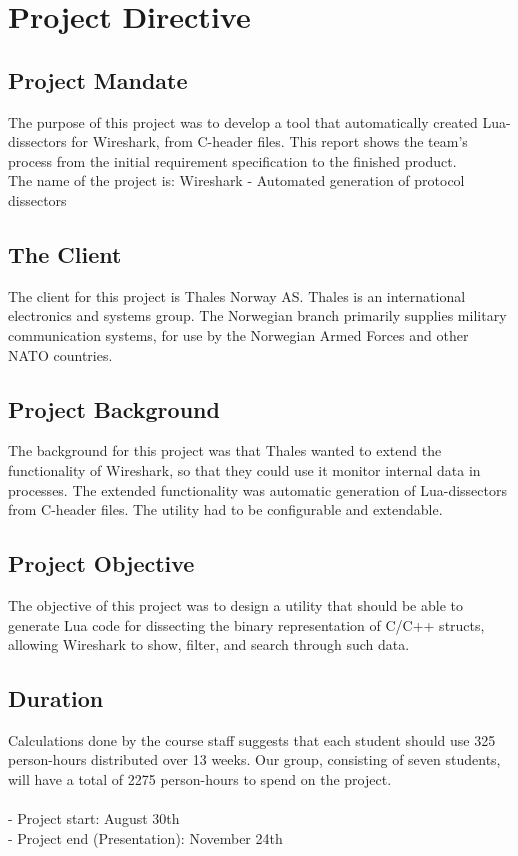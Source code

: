 \chapter{Project Directive}


\section{Project Mandate}
The purpose of this project was to develop a tool that automatically created Lua-dissectors for Wireshark, from C-header files. This report shows the team’s process from the initial requirement specification to the finished product. 
\\
The name of the project is: Wireshark - Automated generation of protocol dissectors

\section{The Client}
The client for this project is Thales Norway AS. Thales is an international electronics and systems group. The Norwegian branch primarily supplies military communication systems, for use by the Norwegian Armed Forces and other NATO countries.

\section{Project Background}
The background for this project was that Thales wanted to extend the functionality of Wireshark, so that they could use it monitor internal data in processes. The extended functionality was automatic generation of Lua-dissectors from C-header files. The utility had to be configurable and extendable.

\section{Project Objective}
 The objective of this project was to design a utility that should be able to generate Lua code for dissecting the binary representation of C/C++ structs, allowing Wireshark to show, filter, and search through such data.

\section{Duration}
Calculations done by the course staff suggests that each student should use 325 person-hours distributed over 13 weeks. Our group, consisting of seven students, will have a total of 2275 person-hours to spend on the project.\\
\\- Project start: August 30th
\\- Project end (Presentation): November 24th


